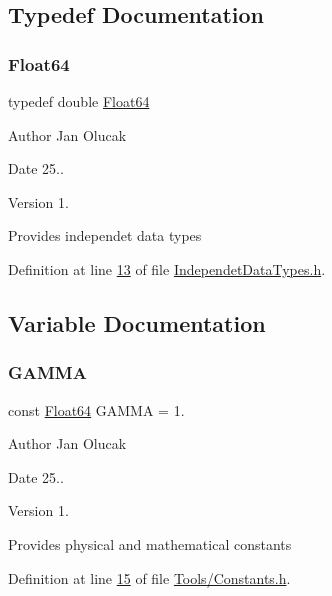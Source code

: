 \subsection{Typedef Documentation}
\mbox{\label{group___tools_ga3f1431cb9f76da10f59246d1d743dc2c}} 
\subsubsection{\texorpdfstring{Float64}{Float64}}
{\footnotesize\ttfamily typedef double \hyperlink{group___tools_ga3f1431cb9f76da10f59246d1d743dc2c}{Float64}}

\begin{DoxyAuthor}{Author}
Jan Olucak 
\end{DoxyAuthor}
\begin{DoxyDate}{Date}
25.. 
\end{DoxyDate}
\begin{DoxyVersion}{Version}
1.
\end{DoxyVersion}
Provides independet data types 

Definition at line \hyperlink{_independet_data_types_8h_source_l00013}{13} of file \hyperlink{_independet_data_types_8h_source}{Independet\+Data\+Types.\+h}.



\subsection{Variable Documentation}
\mbox{\label{group___tools_ga6e7b8e4a71fb3f6d37718ac5d614f560}} 
\subsubsection{\texorpdfstring{G\+A\+M\+MA}{GAMMA}}
{\footnotesize\ttfamily const \hyperlink{group___tools_ga3f1431cb9f76da10f59246d1d743dc2c}{Float64} G\+A\+M\+MA = 1.}

\begin{DoxyAuthor}{Author}
Jan Olucak 
\end{DoxyAuthor}
\begin{DoxyDate}{Date}
25.. 
\end{DoxyDate}
\begin{DoxyVersion}{Version}
1.
\end{DoxyVersion}
Provides physical and mathematical constants 

Definition at line \hyperlink{_tools_2_constants_8h_source_l00015}{15} of file \hyperlink{_tools_2_constants_8h_source}{Tools/\+Constants.\+h}.

